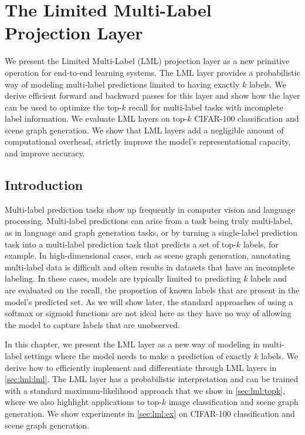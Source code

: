 \graphicspath{{lml-images/}}

\chapter{The Limited Multi-Label Projection Layer}
\label{sec:lml}

We present the Limited Multi-Label (LML) projection layer as a
new primitive operation for end-to-end learning systems.
The LML layer provides a probabilistic way of modeling
multi-label predictions limited to having exactly $k$ labels.
We derive efficient forward and backward passes for this layer
and show how the layer can be used to optimize the top-$k$
recall for multi-label tasks with incomplete label information.
We evaluate LML layers on top-$k$ CIFAR-100 classification and
scene graph generation. We show that LML layers add a negligible
amount of computational overhead, strictly improve the
model's representational capacity, and improve accuracy.

\section{Introduction}
Multi-label prediction tasks show up frequently
in computer vision and language processing.
Multi-label predictions can arise from a task being truly
multi-label, as in language and graph generation tasks,
or by turning a single-label prediction task into a multi-label
prediction task that predicts a set of top-$k$ labels,
for example.
In high-dimensional cases, such as scene graph generation,
annotating multi-label data is difficult and often results
in datasets that have an incomplete labeling.
In these cases, models are typically limited to predicting
$k$ labels and are evaluated on the recall,
the proportion of known labels that are present in
the model's predicted set.
As we will show later, the standard approaches of using
a softmax or sigmoid functions
are not ideal here as they have no way of allowing the model
to capture labels that are unobserved.

In this chapter, we present the LML layer as a new way of
modeling in multi-label settings where the model needs to make a
prediction of exactly $k$ labels.
We derive how to efficiently implement and differentiate
through LML layers in \cref{sec:lml:lml}.
The LML layer has a probabilistic interpretation and can be
trained with a standard maximum-likelihood approach
that we show in \cref{sec:lml:topk}, where we also
highlight applications to top-$k$ image classification
and scene graph generation.
We show experiments in \cref{sec:lml:ex} on
\mbox{CIFAR-100} classification and
scene graph generation.

